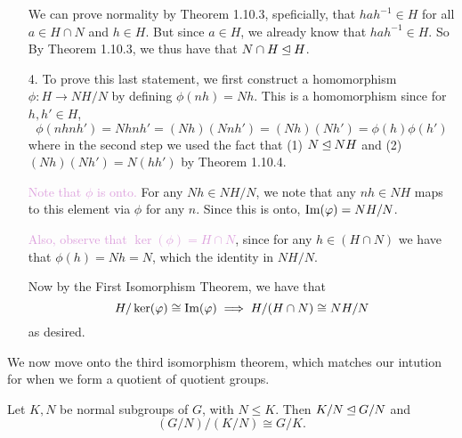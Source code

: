 \begin{prf}
\begin{itemize}
            We can prove
            normality by Theorem 1.10.3, speficially, that $hah^{-1}
            \in H$ for all $a \in
            H \cap N$ and $h \in H$. But since $a \in H$,
            we already know that $hah^{-1} \in H$. So 
            By Theorem 1.10.3, we
            thus have that $N \cap H \unlhd H$.

            \item[4.] \textcolor{NavyBlue}{To prove this last statement, we first construct
            a homomorphism $\phi: H \to NH/N$ by defining $\phi(nh) =
            Nh$.} This is a homomorphism since for $h, h' \in H$,
            \[
                \phi(nhnh') = Nhnh' = (Nh)(Nnh') = (Nh)(Nh') = \phi(h)\phi(h')
            \]
            where in the second step we used the fact that (1) $N
            \unlhd NH$ and (2) $(Nh)(Nh') = N(hh')$ by Theorem 1.10.4.
            
            \textcolor{Plum}{Note that $\phi$ is onto.} For any $Nh \in NH/N$, we note
            that any $nh \in NH$ maps to this element via $\phi$ for
            any $n$. Since this is onto, $\mbox{Im}(\varphi) = NH/N$. 

            \textcolor{Plum}{Also, observe that $\ker(\phi) = H \cap N$}, since for any
            $h \in (H \cap N)$ we have that $\phi(h) = Nh = N$, which
            the identity in $NH/N$.

            Now by the First Isomorphism Theorem, we have that 
            \[
                H/\ker(\varphi) \cong \mbox{Im}(\varphi) \implies H/(H \cap N) \cong NH/N
            \]
            as desired.
        \end{itemize}
    \end{prf}

    We now move onto the third isomorphism theorem, which matches our
    intution for when we form a quotient of quotient groups.

    \begin{thm}
        Let $K, N$ be normal subgroups of $G$, with $N \le K$.
        Then $K/N \unlhd G/N$ and 
        \[
            (G/N)/(K/N) \cong G/K.   
        \]
        \vspace{-0.5cm}
    \end{thm}
    

